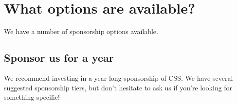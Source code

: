 \documentclass[]{article}
\begin{document}
\pagebreak

\section*{What options are available?}

We have a number of sponsorship options available. 

\subsection*{Sponsor us for a year}

We recommend investing in a year-long sponsorship of CSS. We have several suggested sponsorship tiers, but don't hesitate to ask us if you're looking for something specific!

\def\arraystretch{1.5}

\end{document}
